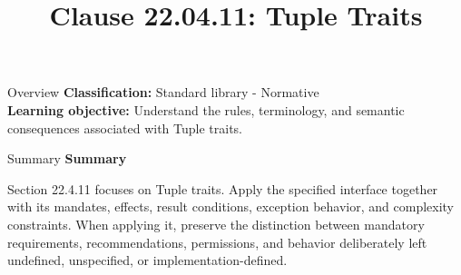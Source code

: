 \documentclass[10pt,letterpaper]{article}
\title{Clause 22.04.11: Tuple Traits}
\author{}
\date{}
\begin{document}
\maketitle
\begin{CornellOverviewBox}{Overview}
\textbf{Classification:} Standard library - Normative\\[2pt]
\textbf{Learning objective:} Understand the rules, terminology, and semantic consequences associated with Tuple traits.
\end{CornellOverviewBox}\begin{CornellSummaryBox}{Summary}
{\sffamily\bfseries\color{Accent} Summary}\par\vspace{3pt}Section 22.4.11 focuses on Tuple traits. Apply the specified interface together with its mandates, effects, result conditions, exception behavior, and complexity constraints. When applying it, preserve the distinction between mandatory requirements, recommendations, permissions, and behavior deliberately left undefined, unspecified, or implementation-defined.
\end{CornellSummaryBox}
\end{document}
